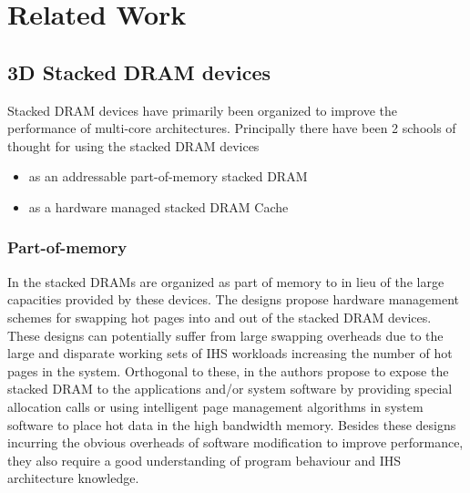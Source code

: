 \chapter{Related Work} \label{chap:related-work}
\section{3D Stacked DRAM devices}
Stacked DRAM devices have primarily been organized to improve the performance of multi-core architectures. Principally there have been 2 schools of thought for using the stacked DRAM devices 
\begin{itemize}
	\item as an addressable part-of-memory stacked DRAM 
	\item as a hardware managed stacked DRAM Cache
\end{itemize}
\subsection{Part-of-memory}
In \cite{pom,cameo} the stacked DRAMs are organized as part of memory to in lieu of the large capacities provided by these devices. The designs propose hardware management schemes for swapping hot pages into and out of the stacked DRAM devices. These designs can potentially suffer from large swapping overheads due to the large and disparate working sets of IHS workloads increasing the number of hot pages in the system. Orthogonal to these, in \cite{software-dram} the authors propose to expose the stacked DRAM to the applications and/or system software by providing special allocation calls or using intelligent page management algorithms in system software to place hot data in the high bandwidth memory. Besides these designs incurring the obvious overheads of software modification to improve performance, they also require a good understanding of program behaviour and IHS architecture knowledge.
